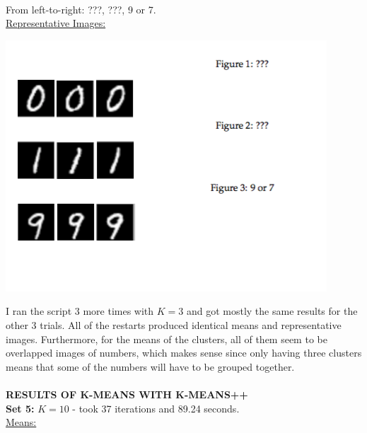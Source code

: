 \documentclass[submit]{harvardml}
\begin{document}
\\\noindent From left-to-right: ???, ???, 9 or 7.\\
\underline{Representative Images:}\\
	\centerline{\includegraphics[scale=0.5]{./dafuq}}	
\noindent I ran the script 3 more times with $K = 3$ and got mostly the same results for the other 3 trials. All of the restarts produced identical means and representative images. Furthermore, for the means of the clusters, all of them seem to be overlapped images of numbers, which makes sense since only having three clusters means that some of the numbers will have to be grouped together.  \\ \\
\noindent\textbf{RESULTS OF K-MEANS WITH K-MEANS++} \\
 \textbf{Set 5:} $K=10$ - took 37 iterations and 89.24 seconds.\\
 \underline{Means:}\\
\end{document}
